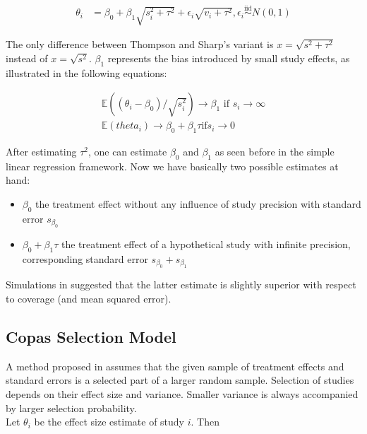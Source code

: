 \begin{align}
\theta_i & = \beta_0 + \beta_1\sqrt{s_i^2 + \tau^2} + \epsilon_i\sqrt{v_i + \tau^2}, \epsilon_i \stackrel{\textrm{iid}}{\sim} N(0,1)  \label{eq:limitmeta.regression}
\end{align}

The only difference between Thompson and Sharp's variant is $x = \sqrt{s^2 + \tau^2}$ instead of $x = \sqrt{s^2}$. $\beta_{1}$ represents the bias introduced by small study effects, as illustrated in the following equations:

\begin{align}
\mathbb{E}((\theta_i - \beta_0)/\sqrt{s_i^2}) \rightarrow \beta_1 \textrm{ if } s_i \rightarrow \infty \nonumber \\ %
\mathbb{E}(theta_i) \rightarrow \beta_0 + \beta_1 \tau \textrm{if} s_i \rightarrow 0 \nonumber
\end{align}

After estimating $\tau^2$, one can estimate $\beta_{0}$ and $\beta_{1}$ as seen before in the simple linear regression framework. Now we have basically two possible estimates at hand:
\begin{itemize}
\item $\beta_0$ the treatment effect without any influence of study precision with standard error $s_{\beta_0}$
\item $\beta_0 + \beta_1 \tau$ the treatment effect of a hypothetical study with infinite precision, corresponding standard error $s_{\beta_0} + s_{\beta_1}$
\end{itemize}

Simulations in \citet{limitmeta} suggested that the latter estimate is slightly superior with respect to coverage (and mean squared error).



\subsection{Copas Selection Model}

A method proposed in \cite{Copas1,Copas2,Copas3} 
assumes that the given sample of treatment effects and standard errors is a selected part of a larger random sample. Selection of studies depends on their effect size and variance. Smaller variance is always accompanied by larger selection probability. \\
Let $\theta_i$ be the effect size estimate of study $i$. Then 

